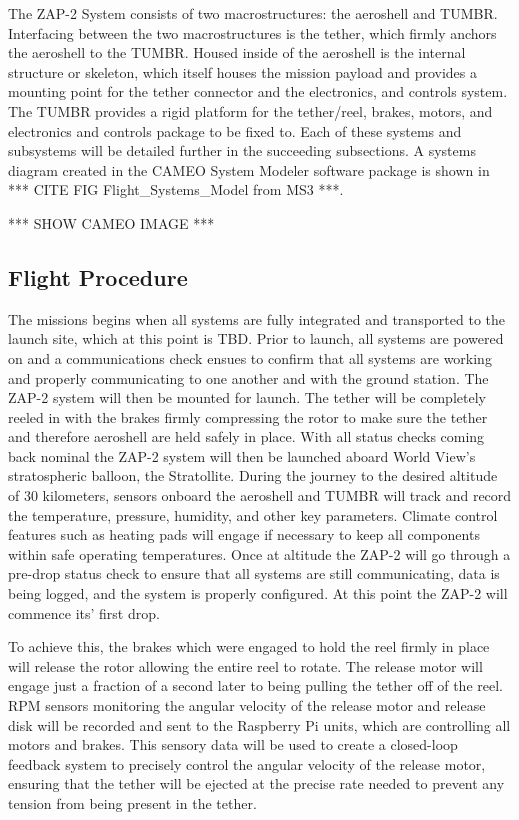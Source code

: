 The ZAP-2 System consists of two macrostructures: the aeroshell and TUMBR. Interfacing between the two macrostructures is the tether, which firmly anchors the aeroshell to the TUMBR. Housed inside of the aeroshell is the internal structure or skeleton, which itself houses the mission payload and provides a mounting point for the tether connector and the electronics, and controls system. The TUMBR provides a rigid platform for the tether/reel, brakes, motors, and electronics and controls package to be fixed to. Each of these systems and subsystems will be detailed further in the succeeding subsections. A systems diagram created in the CAMEO System Modeler software package is shown in *** CITE FIG Flight\_Systems\_Model from MS3 ***. 

*** SHOW CAMEO IMAGE ***

\subsection{Flight Procedure}

\indent\indent The missions begins when all systems are fully integrated and transported to the launch site, which at this point is TBD. Prior to launch, all systems are powered on and a communications check ensues to confirm that all systems are working and properly communicating to one another and with the ground station. The ZAP-2 system will then be mounted for launch. The tether will be completely reeled in with the brakes firmly compressing the rotor to make sure the tether and therefore aeroshell are held safely in place. With all status checks coming back nominal the ZAP-2 system will then be launched aboard World View's stratospheric balloon, the Stratollite. During the journey to the desired altitude of 30 kilometers, sensors onboard the aeroshell and TUMBR will track and record the temperature, pressure, humidity, and other key parameters. Climate control features such as heating pads will engage if necessary to keep all components within safe operating temperatures. Once at altitude the ZAP-2 will go through a pre-drop status check to ensure that all systems are still communicating, data is being logged, and the system is properly configured. At this point the ZAP-2 will commence its' first drop. 

To achieve this, the brakes which were engaged to hold the reel firmly in place will release the rotor allowing the entire reel to rotate. The release motor will engage just a fraction of a second later to being pulling the tether off of the reel. RPM sensors monitoring the angular velocity of the release motor and release disk will be recorded and sent to the Raspberry Pi units, which are controlling all motors and brakes. This sensory data will be used to create a closed-loop feedback system to precisely control the angular velocity of the release motor, ensuring that the tether will be ejected at the precise rate needed to prevent any tension from being present in the tether. 

